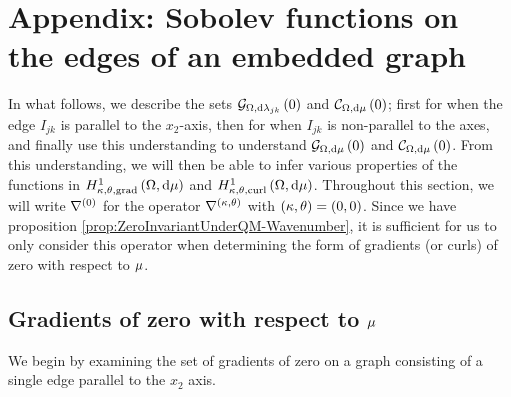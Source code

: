 \section{Appendix: Sobolev functions on the edges of an embedded graph} \label{app:3DMuAnalysis}
In what follows, we describe the sets $\mathcal{G}_{ \Omega, \mathrm{d}\lambda_{jk}}\left( 0 \right)$ and $\mathcal{C}_{ \Omega, \mathrm{d}\mu}\left( 0 \right)$; first for when the edge $I_{jk}$ is parallel to the $x_2$-axis, then for when $I_{jk}$ is non-parallel to the axes, and finally use this understanding to understand $\mathcal{G}_{ \Omega, \mathrm{d}\mu}\left( 0 \right)$ and $\mathcal{C}_{ \Omega, \mathrm{d}\mu}\left( 0 \right)$.
From this understanding, we will then be able to infer various properties of the functions in $H^1_{\kappa,\theta,\mathrm{grad}}\left( \Omega, \mathrm{d}\mu \right)$ and $H^1_{\kappa,\theta,\mathrm{curl}}\left( \Omega, \mathrm{d}\mu \right)$.
Throughout this section, we will write $\nabla^{(0)}$ for the operator $\nabla^{\left( \kappa, \theta \right)}$ with $\left( \kappa, \theta \right)=\left( 0,0 \right)$.
Since we have proposition \ref{prop:ZeroInvariantUnderQM-Wavenumber}, it is sufficient for us to only consider this operator when determining the form of gradients (or curls) of zero with respect to $\mu$.

\subsection{Gradients of zero with respect to $\mu$} \label{apps:3DGradientsOfZero}
We begin by examining the set of gradients of zero on a graph consisting of a single edge parallel to the $x_2$ axis.

